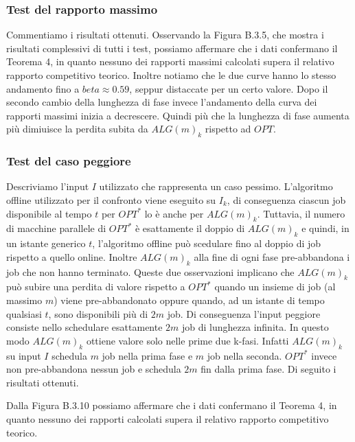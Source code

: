 \documentclass[12pt]{article}
\begin{document}
\subsubsection{Test del rapporto massimo}
Commentiamo i risultati ottenuti. Osservando la Figura B.3.5, che mostra i risultati complessivi di tutti i test, possiamo affermare che i dati confermano il Teorema 4, in quanto nessuno dei rapporti massimi calcolati supera il relativo rapporto competitivo teorico. Inoltre notiamo che le due curve hanno lo stesso andamento fino a $beta \approx 0.59$, seppur distaccate per un certo valore. Dopo il secondo cambio della lunghezza di fase invece l'andamento della curva dei rapporti massimi inizia a decrescere. Quindi più che la lunghezza di fase aumenta più dimiuisce la perdita subita da $ALG(m)_{k}$ rispetto ad $OPT$.
 
\subsubsection{Test del caso peggiore}
Descriviamo l'input $I$ utilizzato che rappresenta un caso pessimo. L'algoritmo offline utilizzato per il confronto viene eseguito su $I_{k}$, di conseguenza ciascun job disponibile al tempo $t$ per $OPT^{*}$ lo è anche per $ALG(m)_{k}$. Tuttavia, il numero di macchine parallele di $OPT^{*}$ è esattamente il doppio di $ALG(m)_{k}$ e quindi, in un istante generico $t$, l'algoritmo offline può scedulare fino al doppio di job rispetto a quello online. Inoltre $ALG(m)_{k}$ alla fine di ogni fase pre-abbandona i job che non hanno terminato. Queste due osservazioni implicano che $ALG(m)_{k}$ può subire una perdita di valore rispetto a $OPT^{*}$ quando un insieme di job (al massimo $m$) viene pre-abbandonato oppure quando, ad un istante di tempo qualsiasi $t$, sono disponibili più di $2m$ job. Di conseguenza l'input peggiore consiste nello schedulare esattamente $2m$ job di lunghezza infinita. In questo modo $ALG(m)_{k}$ ottiene valore solo nelle prime due k-fasi. Infatti $ALG(m)_{k}$ su input $I$ schedula $m$ job nella prima fase e $m$ job nella seconda. $OPT^{*}$ invece non pre-abbandona nessun job e schedula $2m$ fin dalla prima fase. Di seguito i risultati ottenuti.

Dalla Figura B.3.10 possiamo affermare che i dati confermano il Teorema 4, in quanto nessuno dei rapporti calcolati supera il relativo rapporto competitivo teorico.
\end{document}
